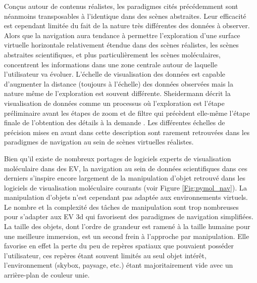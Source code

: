 Conçus autour de contenus réalistes, les paradigmes cités précédemment sont néanmoins transposables à l'identique dans des scènes abstraites. Leur efficacité est cependant limitée du fait de la nature très différentes des données à observer. Alors que la navigation aura tendance à permettre l'exploration d'une surface virtuelle horizontale relativement étendue dans des scènes réalistes, les scènes abstraites scientifiques, et plus particulièrement les scènes moléculaires, concentrent les informations dans une zone centrale autour de laquelle l'utilisateur va évoluer. L'échelle de visualisation des données est capable d'augmenter la distance (toujours à l'échelle) des données observées mais la nature même de l'exploration est souvent différente. Sheidermann décrit la visualisation de données comme un processus où l'exploration est l'étape préliminaire avant les étapes de zoom et de filtre qui précèdent elle-même l'étape finale de l'obtention des détails à la demande \cite{shneiderman_eyes_1996}. Les différentes échelles de précision mises en avant dans cette description sont rarement retrouvées dans les paradigmes de navigation au sein de scènes virtuelles réalistes.

Bien qu'il existe de nombreux portages de logiciels experts de visualisation moléculaire dans des EV, la navigation au sein de données scientifiques dans ces derniers s’inspire encore largement de la manipulation d'objet retrouvé dans les logiciels de visualisation moléculaire courants (voir Figure \ref{Fig:pymol_nav}). La manipulation d'objets n'est cependant pas adaptée aux environnements virtuels. Le nombre et la complexité des tâches de manipulation sont trop nombreuses pour s'adapter aux EV 3d qui favorisent des paradigmes de navigation simplifiées. La taille des objets, dont l'ordre de grandeur est ramené à la taille humaine pour une meilleure immersion, est un second frein à l'approche par manipulation. Elle favorise en effet la perte du peu de repères spatiaux que pouvaient posséder l'utilisateur, ces repères étant souvent limités au seul objet intérêt, l'environnement (skybox, paysage, etc.) étant majoritairement vide avec un arrière-plan de couleur unie.   

